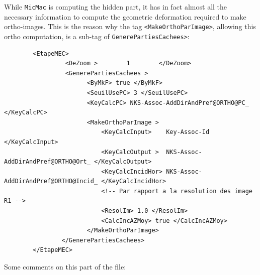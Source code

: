 While {\tt MicMac} is computing the hidden part, it has in fact almost all the necessary information
to compute the geometric deformation required to make ortho-images. This is the reason why
the tag {\tt <MakeOrthoParImage>}, allowing this ortho computation, is a sub-tag of
 {\tt GenerePartiesCachees>}:

{\scriptsize
\begin{verbatim}
        <EtapeMEC>
                 <DeZoom >        1        </DeZoom>
                 <GenerePartiesCachees >
                       <ByMkF> true </ByMkF>
                       <SeuilUsePC> 3 </SeuilUsePC>
                       <KeyCalcPC> NKS-Assoc-AddDirAndPref@ORTHO@PC_ </KeyCalcPC>
                       <MakeOrthoParImage >
                           <KeyCalcInput>    Key-Assoc-Id </KeyCalcInput>
                           <KeyCalcOutput >  NKS-Assoc-AddDirAndPref@ORTHO@Ort_ </KeyCalcOutput>
                           <KeyCalcIncidHor> NKS-Assoc-AddDirAndPref@ORTHO@Incid_ </KeyCalcIncidHor>
                           <!-- Par rapport a la resolution des image R1 -->
                           <ResolIm> 1.0 </ResolIm>
                           <CalcIncAZMoy> true </CalcIncAZMoy>
                       </MakeOrthoParImage>
                </GenerePartiesCachees>
        </EtapeMEC>

\end{verbatim}
}

Some comments on this  part of the file:

